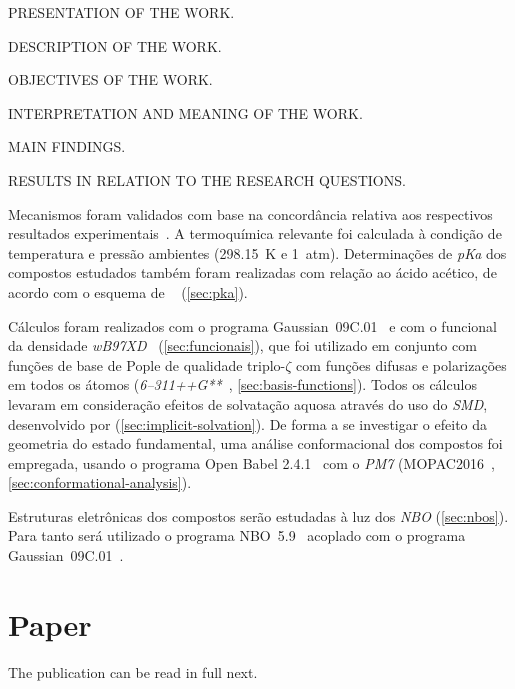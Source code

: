 PRESENTATION OF THE WORK.\@

DESCRIPTION OF THE WORK.\@

OBJECTIVES OF THE WORK.\@

INTERPRETATION AND MEANING OF THE WORK.\@

MAIN FINDINGS.\@

RESULTS IN RELATION TO THE RESEARCH QUESTIONS.\@



Mecanismos foram validados com base na concordância relativa aos respectivos resultados experimentais~\cite{Kirby_1972,Jung_2005}.
A termoquímica relevante foi calculada à condição de temperatura e pressão ambientes (298.15~K e 1~atm).
Determinações de \emph{pKa} dos compostos estudados também foram realizadas com
relação ao ácido acético, de acordo com o esquema de
\citeauthor{Ding_2009}~\cite{Ding_2009} (\cref{sec:pka}).

Cálculos foram realizados com o programa Gaussian~09C.01~\cite{g09} e com o funcional da densidade
\emph{wB97XD}~\cite{Chai_2008a,Chai_2008b} (\cref{sec:funcionais}), que foi
utilizado em conjunto com funções de base de Pople de qualidade triplo-$\zeta$
com funções difusas e polarizações em todos os átomos
(\emph{6--311++G**}~\cite{Ditchfield_1971,Hehre_1972,Hariharan_1973,Hariharan_1974,Gordon_1980,Francl_1982,Clark_1983,Frisch_1984,Binning_1990,Blaudeau_1997,Rassolov_1998,Rassolov_2001},
\cref{sec:basis-functions}).
Todos os cálculos levaram em consideração efeitos de solvatação aquosa através
do uso do \emph{SMD}, desenvolvido por \citeauthor{Marenich_2009} (\cref{sec:implicit-solvation}).
De forma a se investigar o efeito da geometria do estado fundamental, uma
análise conformacional dos compostos foi empregada, usando o programa Open
Babel 2.4.1~\cite{O_Boyle_2011} com o \emph{PM7} (MOPAC2016~\cite{MOPAC},
\cref{sec:conformational-analysis}).

Estruturas eletrônicas dos compostos serão estudadas à luz dos \emph{NBO}
(\cref{sec:nbos}).
Para tanto será utilizado o programa NBO~5.9~\cite{NBO5.9} acoplado com o programa Gaussian~09C.01~\cite{g09}.

\section{Paper}

The publication can be read in full next.


